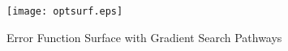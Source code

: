 \documentclass[11pt,a4paper]{article}
\begin{document}
\begin{figure}
    \centering
    \texttt{[image: optsurf.eps]}
    \caption{Error Function Surface with Gradient Search Pathways}
    \label{fig:optsurf}
\end{figure}

\end{document}
